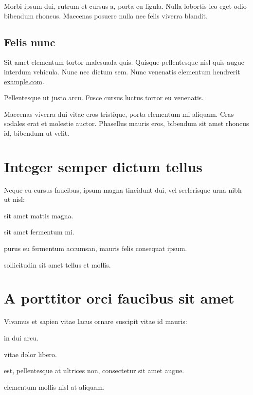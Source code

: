Morbi ipsum dui, rutrum et cursus a, porta eu ligula. Nulla lobortis leo eget
odio bibendum rhoncus. Maecenas posuere nulla nec felis viverra blandit.

\subsection{Felis nunc}

Sit amet elementum tortor malesuada quis. Quisque pellentesque nisl quis augue
interdum vehicula. Nunc nec dictum sem. Nunc venenatis elementum hendrerit \href{https://example.com/}{example.com}.

\begin{remark}
Pellentesque ut justo arcu. Fusce cursus luctus tortor eu venenatis.
\end{remark}

Maecenas viverra dui vitae eros tristique, porta elementum mi aliquam. Cras
sodales erat et molestie auctor. Phasellus mauris eros, bibendum sit amet
rhoncus id, bibendum ut velit.


\section*{Integer semper dictum tellus}

Neque eu cursus faucibus, ipsum magna tincidunt dui, vel scelerisque urna nibh ut nisl:

\begin{description}[labelwidth=\widthof{\bfseries morbi convallis},align=left]
\item[Duis]{sit amet mattis magna.}
\item[Curabitur]{sit amet fermentum mi.}
\item[Morbi convallis]{purus eu fermentum accumsan, mauris felis consequat ipsum.}
\item[Ut]{sollicitudin sit amet tellus et mollis.}
\end{description}

\section*{A porttitor orci faucibus sit amet}

Vivamus et sapien vitae lacus ornare suscipit vitae id mauris:

\begin{description}[labelwidth=\widthof{\bfseries suspendisse},align=left]
\item[Vivamus]{in dui arcu.}
\item[Morbi]{vitae dolor libero.}
\item[Tellus]{est, pellentesque at ultrices non, consectetur sit amet augue.}
\item[Suspendisse]{elementum mollis nisl at aliquam.}
\end{description}

